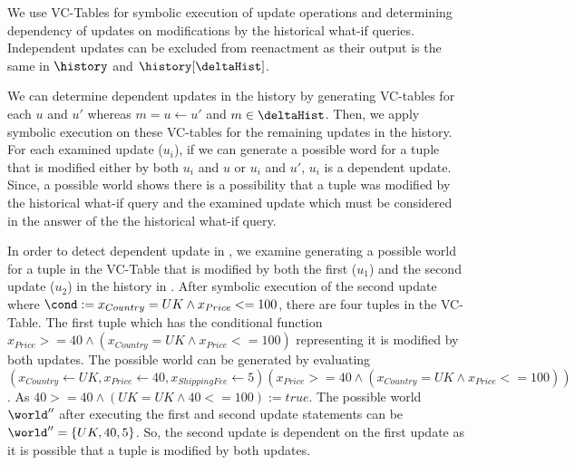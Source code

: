 
We use VC-Tables for symbolic execution of update operations and determining dependency of updates on  modifications by the historical what-if queries. Independent updates can be excluded from reenactment as their output is the same in $\history$ and $\history[\deltaHist]$.


%
%


We can determine dependent updates in the history by generating VC-tables for each $u$ and $ u'$ whereas $m = u \gets u'$ and $m \in \deltaHist$. Then, we apply symbolic execution on these VC-tables for the remaining updates in the history. For each examined update ($u_i$), if we can generate a possible word for a tuple that is modified either by both $u_i$ and $u$ or $u_i$ and $u'$, $u_i$ is a dependent update. Since, a possible world shows there is a possibility that a tuple was modified by the historical what-if query and the examined update which must be considered in the answer of the the historical what-if query.




\begin{exam}
In order to detect dependent update in , we examine generating a possible world for a tuple in the VC-Table that is modified by both the first ($u_1$) and the second update ($u_2$) in the history in .
 After symbolic execution of the second update where $\cond:= x_{Country}=UK \wedge x_{Price} <=100$, there are four tuples in the VC-Table. The first tuple which has the conditional function
 $x_{Price} >=40 \wedge (x_{Country}=UK \wedge x_{Price} <=100)$ representing it is modified by both updates. The possible world can be generated by evaluating $(x_{Country} \leftarrow UK,x_{Price} \leftarrow 40,x_{ShippingFee} \leftarrow 5)(x_{Price}>=40 \wedge (x_{Country}=UK \wedge x_{Price} <=100))$. As $40>=40 \wedge (UK=UK \wedge 40 <=100):= true$. The possible world $\world''$ after executing the first and second update statements can be $\world''=\lbrace UK,40,5\rbrace$. So, the second update is dependent on the first update as it is possible that  a tuple is modified by both updates.
\end{exam}





